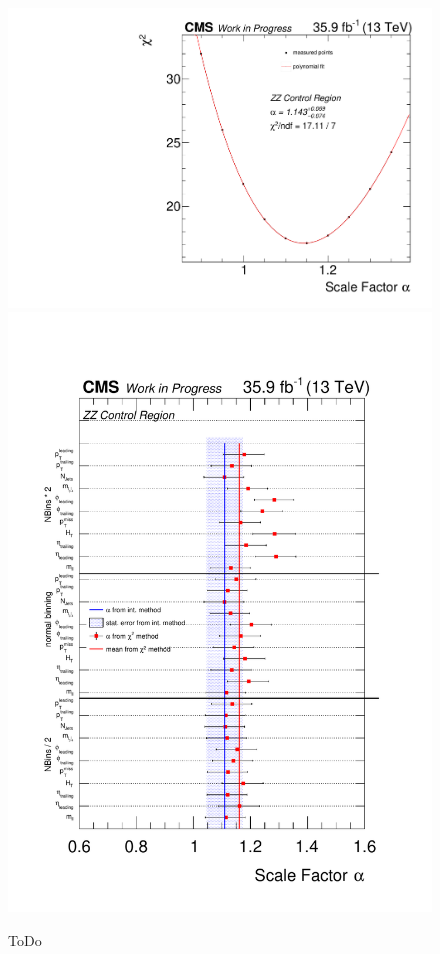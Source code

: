 \begin{figure}[tbp]
 \centering
 \includegraphics[width=\pairwidth]{figures/plots_CR/chi/ZZ_met}
 \includegraphics[width=\pairwidth]{figures/plots_CR/chi/ZZ_Compare}
 \caption{ToDo}
 \label{fig:chiZZ}
\end{figure}

